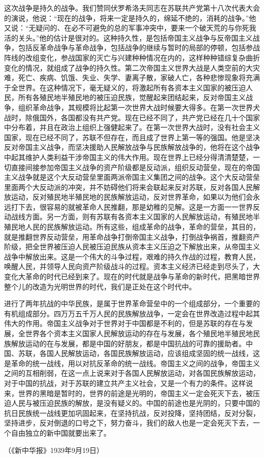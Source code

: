 这次战争是持久的战争。我们赞同伏罗希洛夫同志在苏联共产党第十八次代表大会的演说，他说：“现在的战争，将来一定是持久的，绵延不绝的，消耗的战争。”他又说：“无疑问的、在必不可避免的总的军事冲突中，要来一个破天荒的与你死我活的关头。”他的估计是很对的。这种持久性，是包括帝国主义战争与反帝国主义战争，包括反革命战争与革命战争，包括战争的继续与暂时的局部的停顿，包括参战阵线的改组变化，参战国家的灭亡与兴建种种情况在内的，这样种种错综复杂曲折变化的情况，就组成了战争的持久性。第二次帝国主义世界大战是人类空前的大灾难，死亡、疾病、饥饿、失业、失学、妻离子散，家破人亡，各种悲惨现象将充满于全世界。在这种情况下，毫无疑义的，将激起所有各资本主义国家的被压迫人民，所有各殖民地半殖民地的被压迫民族，觉醒起来团结起来，反对帝国主义战争，组织革命战争，其规模将比起第一次世界大战时候要大得多。在第一次世界犬战时，除俄国外，各国都没有共产党。现在已经不同了，共产党已经在几十个国家中分布着，并且在政治上组织上强健起来了。在第一次世界大战时，没有社会主义国家，现在已经不同了，苏联不但存在，而且成了世界上第一等的强国。他是坚决反对帝国主义战争，而坚决援助人民解放战争与民族解放战争的，他将在这个战争中起其维护人类利益干涉帝国主义的伟大作用。现在世界上已经分得清清楚楚，一切直接间接参加帝国主义战争的资产阶级都是反动派，组织反动营垒，现在的帝国主义战争就是这个大反动营垒里面两派帝国主义集团之间的战争。这个大反动营垒里面两个大反动派的冲突，并不妨碍他们将来会联起来反对苏联，反对各国人民解放运动，反对殖民地半殖民地的民族解放运动，反对世界革命，如果以为他们会永远打下去，很容易的就被革命人民推翻，那是幼稚的见解。这是一方面一一世界反动战线方面。另一方面，则有苏联有各资本主义国家的人民解放运动，有殖民地半殖民地人民的民族解放运动。所有这些，组成革命的战争，革命的营垒，其目的，就是推翻世界反动营垒，用革命战争打倒帝国主义战争，打倒战争祸首，推翻资产阶级，把全世界被压迫人民被压迫民族从资本主义压迫之下解放出来，从帝国主义战争中解放出来。这是一个伟大的斗争过程，艰难的持久作战的过程，教育人民，唤醒人民，并领导人民向资产阶级战斗的过程。资本主义经济已经走到尽头了，大变化大革命的时代已经到来了。现在的时代就是战争与革命的新时代，把黑暗世界整个儿的改造为光明世界的时代，我们是正处在这个时代中。

进行了两年抗战的中华民族，是属于世界革命营垒中的一个组成部分，一个重要的有机组成部分。四万万五千万人民的民族解放战争，一定会在世界改造过程中起其伟大的作用。帝国主义战争对于世界对于中国都是不利的，但是苏联的存在与发展，全世界各个资本主义国家人民解放运动的存在与发展，各个殖民地半殖民地民族解放运动的在与发展，都是中国的好朋友，都是中国抗战的可靠的援助者。中国、苏联，各国人民解放运动，各国民族解放运动，应该组成坚固的统一战线，这是革命的统一战线，用以对抗反革命的统一战线。帝国主义之间的战争，帝国主义之间的互相削弱，在这一点上说来对于各国人民解放运动，对各国民族解放运动，对于中国的抗战，对于苏联的建立共产主义社会，又是一个有力的条件。这样说来，世界的黑暗是暂时的，世界的前途是光明的，帝国主义一定会死灭下去，被压迫人民与被压迫民族的解放，是没有疑义的。中国的前途也是光阴的，只要中国的抗日民族统一战线更加巩固起来，在坚持抗战，反对投降，坚持团结，反对分裂，坚持进步，反对倒退的口号之下，努力奋斗，我们的敌人也是一定会死灭下去，一个自由独立的新中国就要出来了。

（《新中华报》1939年9月19日）

